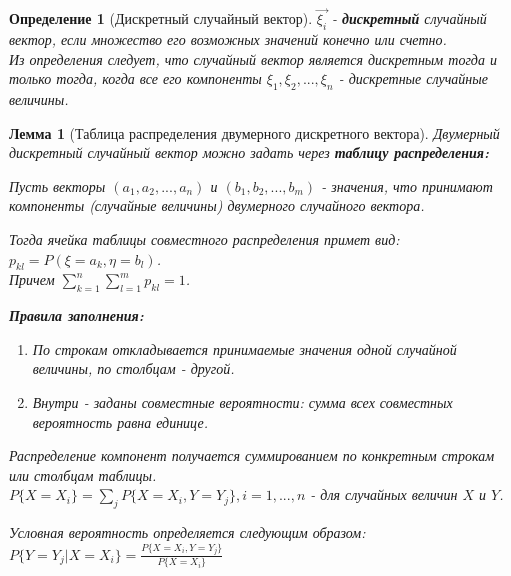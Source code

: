 \documentclass[14pt]{extarticle}
\theoremstyle{breakstyle}
\newtheorem{definition}{Определение}[subsection]
\newtheorem{lemma}{Лемма}[subsection]
\begin{document}
\begin{definition}[Дискретный случайный вектор]

$\vec{\xi_{i}}$ - \textbf{дискретный} случайный вектор, если множество его возможных значений конечно или счетно.\\
Из определения следует, что случайный вектор является дискретным тогда и только тогда, когда все его компоненты $\xi_{1}, \xi_{2}, ..., \xi_{n}$ - дискретные случайные величины.

\end{definition}

\begin{lemma}[Таблица распределения двумерного дискретного вектора]

Двумерный дискретный случайный вектор можно задать через \textbf{таблицу распределения:}

\vspace{\baselineskip}

Пусть векторы $(a_{1}, a_{2}, ..., a_{n})$ и $(b_{1}, b_{2}, ..., b_{m})$ - значения, что принимают компоненты (случайные величины) двумерного случайного вектора.

\vspace{\baselineskip}

Тогда ячейка таблицы совместного распределения примет вид: $p_{kl} = P(\xi = a_{k}, \eta = b_{l})$. \\
Причем $\sum_{k=1}^{n} \sum_{l=1}^{m} p_{kl} = 1$.

\vspace{\baselineskip}

\textbf{Правила заполнения:}
\begin{enumerate}
    \item По строкам откладывается принимаемые значения одной случайной величины, по столбцам - другой.
    \item Внутри - заданы совместные вероятности: сумма всех совместных вероятность равна единице.
\end{enumerate}

\vspace{\baselineskip}

Распределение компонент получается суммированием по конкретным строкам или столбцам таблицы. \\
$P\{X=X_{i}\} = \sum_{j}P\{X=X_{i}, Y=Y_{j}\}, i=1, ..., n$ - для случайных величин $X$ и $Y$.

\vspace{\baselineskip}

Условная вероятность определяется следующим образом:\\
$P\{Y=Y_{j} | X = X_{i}\} = \frac{P\{X=X_{i}, Y=Y_{j}\}}{P\{X=X_{i}\}}$

\end{lemma}
\end{document}
